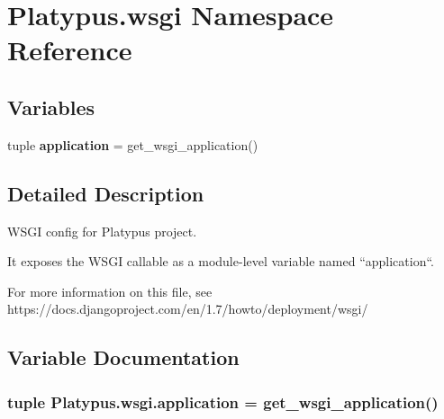 \section{Platypus.\+wsgi Namespace Reference}
\label{namespace_platypus_1_1wsgi}
\subsection*{Variables}
\begin{DoxyCompactItemize}
\item 
tuple {\bf application} = get\+\_\+wsgi\+\_\+application()
\end{DoxyCompactItemize}


\subsection{Detailed Description}
\begin{DoxyVerb}WSGI config for Platypus project.

It exposes the WSGI callable as a module-level variable named ``application``.

For more information on this file, see
https://docs.djangoproject.com/en/1.7/howto/deployment/wsgi/
\end{DoxyVerb}
 

\subsection{Variable Documentation}
\subsubsection[{application}]{\setlength{\rightskip}{0pt plus 5cm}tuple Platypus.\+wsgi.\+application = get\+\_\+wsgi\+\_\+application()}\label{namespace_platypus_1_1wsgi_a942289c73a116be14daec2618a9c7a12}
